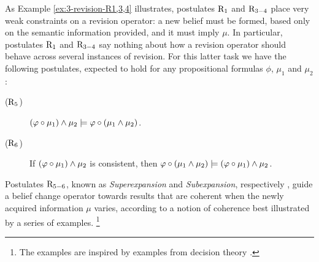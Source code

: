 As Example \ref{ex:3-revision-R1,3,4} illustrates, postulates $\mathrm{R}_{1}$ and $\mathrm{R}_{3-4}$
place very weak constraints on a revision operator:
a new belief must be formed, based only on the semantic information provided, and it must imply $\mu$. 
In particular, postulates $\mathrm{R}_{1}$ and $\mathrm{R}_{3-4}$ say nothing about how a revision operator should behave 
across several instances of revision.
For this latter task we have the following postulates, 
expected to hold for any propositional formulas $\phi$, $\mu_1$ and $\mu_2$: 

\begin{description}
	\item[($\mathrm{R}_{5}$)] $(\varphi\circ\mu_1)\land\mu_2\models\varphi\circ(\mu_1\land\mu_2)$.
	\item[($\mathrm{R}_{6}$)] If $(\varphi\circ\mu_1)\land\mu_2$ is consistent, then $\varphi\circ(\mu_1\land\mu_2)\models(\varphi\circ\mu_1)\land\mu_2$.
\end{description}

Postulates $\mathrm{R}_{5-6}$, known as \emph{Superexpansion} and \emph{Subexpansion}, 
respectively \cite{FermeH18},
guide a belief change operator towards results that are coherent when the newly acquired information $\mu$ varies,
according to a notion of coherence best illustrated by a series of examples.%
\footnote{The examples are inspired by examples from decision theory \cite{LuceR57}.}

